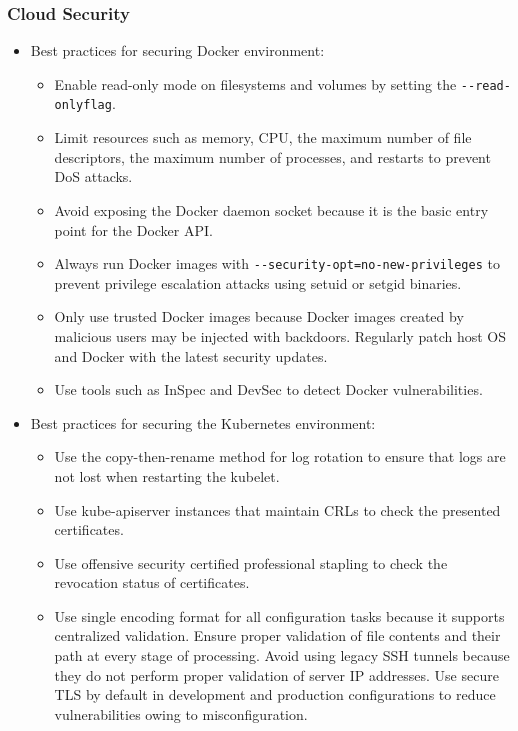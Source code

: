 \subsubsection{Cloud Security}
\begin{itemize}
    \item Best practices for securing Docker environment:
    \begin{itemize}
        \item Enable read-only mode on filesystems and volumes by setting the \verb|--read-onlyflag|.
        \item Limit resources such as memory, CPU, the maximum number of file descriptors, the maximum number of processes, and restarts to prevent DoS attacks.
        \item Avoid exposing the Docker daemon socket because it is the basic entry point for the Docker API.
        \item Always run Docker images with \verb|--security-opt=no-new-privileges| to prevent privilege escalation attacks using setuid or setgid binaries.
        \item Only use trusted Docker images because Docker images created by malicious users may be injected with backdoors.
        Regularly patch host OS and Docker with the latest security updates.
        \item Use tools such as InSpec and DevSec to detect Docker vulnerabilities.
    \end{itemize}
    \item Best practices for securing the Kubernetes environment:
    \begin{itemize}
        \item Use the copy-then-rename method for log rotation to ensure that logs are not lost when restarting the kubelet.
        \item Use kube-apiserver instances that maintain CRLs to check the presented certificates.
        \item Use offensive security certified professional stapling to check the revocation status of certificates.
        \item Use single encoding format for all configuration tasks because it supports centralized validation.
        Ensure proper validation of file contents and their path at every stage of processing.
        Avoid using legacy SSH tunnels because they do not perform proper validation of server IP addresses.
        Use secure TLS by default in development and production configurations to reduce vulnerabilities owing to misconfiguration.
    \end{itemize}
\end{itemize}


